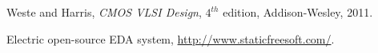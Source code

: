 \documentclass[conference]{IEEEtran}
\begin{document}
\begin{thebibliography}{1}

Weste and Harris, \emph{CMOS VLSI Design}, $4^{th}$ edition, Addison-Wesley, 2011.	

Electric open-source EDA system,
\href{http://www.staticfreesoft.com/}{http://www.staticfreesoft.com/}.


\end{thebibliography}




\end{document}
